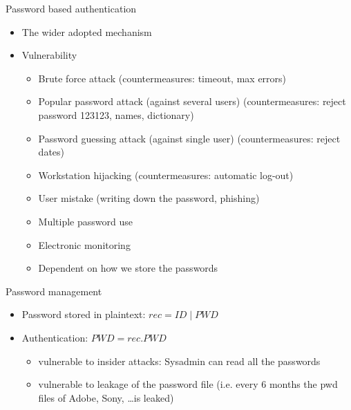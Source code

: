 \documentclass{beamer}
\begin{document}
\begin{frame}{Password based authentication}
  \begin{itemize}
    \item The wider adopted mechanism 
    \item Vulnerability
      \begin{itemize}
        \item Brute force attack (countermeasures: timeout, max errors)
        \item Popular password attack (against several users) (countermeasures: reject password 123123, names, dictionary)
        \item Password guessing attack (against single user) (countermeasures: reject dates)
        \item Workstation hijacking (countermeasures: automatic log-out)
        \item User mistake (writing down the password, phishing)
        \item Multiple password use
        \item Electronic monitoring 
        \item Dependent on how we store the passwords 
      \end{itemize}
  \end{itemize}
\end{frame}

\begin{frame}{Password management}
  \begin{itemize}
    \item Password stored in plaintext: $rec = ID \mid PWD$
    \item Authentication: $PWD = rec.PWD$
      \begin{itemize}
        \item<2-> vulnerable to insider attacks: Sysadmin can read all the passwords
        \item<3-> vulnerable to leakage of the password file (i.e. every 6 months the pwd files of
          Adobe, Sony, \dots is leaked)
      \end{itemize}
  \end{itemize}
\end{frame}
\end{document}
